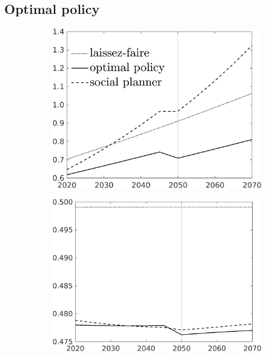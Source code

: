 \subsection{Optimal policy}\label{app:quant_res_opt}


\begin{figure}[h!!]
	\centering
	\caption{Laissez-faire, optimal, and efficient allocation in levels }\label{fig:LF}	
	\begin{subfigure}[]{0.32\textwidth}
		\includegraphics[width=1\textwidth]{../../codding_model/own_basedOnFried/optimalPol_010922_revision/figures/all_13Sept22_Tplus30/C_CompEffOPT_T_NoTaus_regime4_opteff_knspil0_spillover0_noskill0_sep0_xgrowth0_countec0_PV1_etaa0.79_lgd1_lff1.png}
	\end{subfigure}	
	\begin{subfigure}[]{0.32\textwidth}
	\includegraphics[width=1\textwidth]{../../codding_model/own_basedOnFried/optimalPol_010922_revision/figures/all_13Sept22_Tplus30/hh_CompEffOPT_T_NoTaus_regime4_opteff_knspil0_spillover0_noskill0_sep0_xgrowth0_countec0_PV1_etaa0.79_lgd0_lff1.png}

\end{subfigure}
\end{figure}
